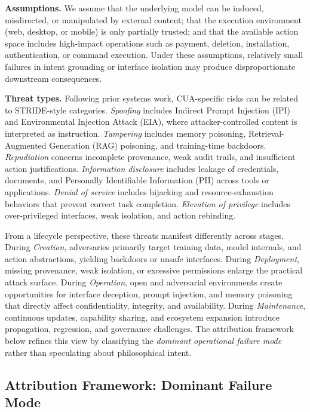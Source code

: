 \textbf{Assumptions.} We assume that the underlying model can be induced, misdirected, or manipulated by external content; that the execution environment (web, desktop, or mobile) is only partially trusted; and that the available action space includes high-impact operations such as payment, deletion, installation, authentication, or command execution. Under these assumptions, relatively small failures in intent grounding or interface isolation may produce disproportionate downstream consequences.

\textbf{Threat types.} Following prior systems work, CUA-specific risks can be related to STRIDE-style categories. \emph{Spoofing} includes Indirect Prompt Injection (IPI) and Environmental Injection Attack (EIA), where attacker-controlled content is interpreted as instruction. \emph{Tampering} includes memory poisoning, Retrieval-Augmented Generation (RAG) poisoning, and training-time backdoors. \emph{Repudiation} concerns incomplete provenance, weak audit trails, and insufficient action justifications. \emph{Information disclosure} includes leakage of credentials, documents, and Personally Identifiable Information (PII) across tools or applications. \emph{Denial of service} includes hijacking and resource-exhaustion behaviors that prevent correct task completion. \emph{Elevation of privilege} includes over-privileged interfaces, weak isolation, and action rebinding.

From a lifecycle perspective, these threats manifest differently across stages. During \emph{Creation}, adversaries primarily target training data, model internals, and action abstractions, yielding backdoors or unsafe interfaces. During \emph{Deployment}, missing provenance, weak isolation, or excessive permissions enlarge the practical attack surface. During \emph{Operation}, open and adversarial environments create opportunities for interface deception, prompt injection, and memory poisoning that directly affect confidentiality, integrity, and availability. During \emph{Maintenance}, continuous updates, capability sharing, and ecosystem expansion introduce propagation, regression, and governance challenges. The attribution framework below refines this view by classifying the \emph{dominant operational failure mode} rather than speculating about philosophical intent.

\subsection{Attribution Framework: Dominant Failure Mode}
\label{subsec:attribution}

